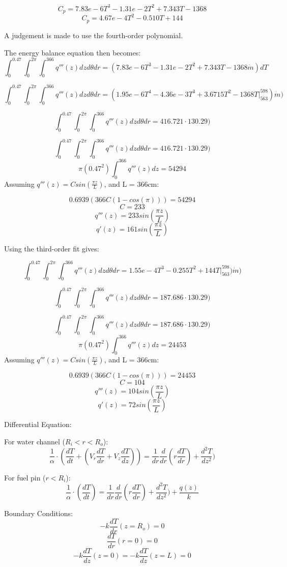 \documentclass[12pt,letterpaper]{article}
\begin{document}
\[C_p = 7.83e-6T^3 -1.31e-2T^2 + 7.343 T - 1368 \]
\[C_p = 4.67e-4T^2 - 0.510 T + 144 \]

A judgement is made to use the fourth-order polynomial.

The energy balance equation then becomes:
\[\int^{0.47}_{0} \int^{2\pi}_{0} \int^{366}_{0} q'''(z) dz d\theta dr= 
    (7.83e-6T^3 -1.31e-2T^2 + 7.343 T - 1368  \dot{m}) dT \]

\[\int^{0.47}_{0} \int^{2\pi}_{0} \int^{366}_{0} q'''(z) dz d\theta dr= 
    (1.95e-6T^4 -4.36e-3T^3 + 3.6715 T^2 - 1368T  \Big|^{598}_{563}) \dot{m})\]

\[\int^{0.47}_{0} \int^{2\pi}_{0} \int^{366}_{0} q'''(z) dz d\theta dr= 
    416.721 \cdot 130.29)\]


\[\int^{0.47}_{0} \int^{2\pi}_{0} \int^{366}_{0} q'''(z) dz d\theta dr= 
    416.721 \cdot 130.29)\]
\[ \pi (0.47^2)  \int^{366}_{0} q'''(z) dz = 54294\]
Assuming $q'''(z) = C sin(\frac{\pi z}{L})$,
and L = 366cm:

\[ 0.6939 (366C(1-cos(\pi))) = 54294\]
\[C = 233\]
\[q'''(z) = 233sin(\frac{\pi z}{L})\]
\[q'(z) = 161sin(\frac{\pi z}{L})\]


Using the third-order fit gives:

\[\int^{0.47}_{0} \int^{2\pi}_{0} \int^{366}_{0} q'''(z) dz d\theta dr= 
     1.55e-4T^3 - 0.255 T^2 + 144T  \Big|^{598}_{563}) \dot{m})\]

\[\int^{0.47}_{0} \int^{2\pi}_{0} \int^{366}_{0} q'''(z) dz d\theta dr= 
    187.686 \cdot 130.29)\]

\[\int^{0.47}_{0} \int^{2\pi}_{0} \int^{366}_{0} q'''(z) dz d\theta dr= 
    187.686 \cdot 130.29)\]
\[ \pi (0.47^2)  \int^{366}_{0} q'''(z) dz = 24453\]
Assuming $q'''(z) = C sin(\frac{\pi z}{L})$,
and L = 366cm:

\[ 0.6939 (366C(1-cos(\pi))) = 24453\]
\[C = 104\]
\[q'''(z) = 104sin(\frac{\pi z}{L})\]
\[q'(z) = 72sin(\frac{\pi z}{L})\]

\pagebreak
Differential Equation:

For water channel ($R_i < r < R_o$):
\[\frac{1}{\alpha} \cdot (\frac{dT}{dt} + (V_r \frac{dT}{dr} + V_z \frac{dT}{dz})) =
  \frac{1}{dr} \frac{d}{dr} (r \frac{dT}{dr}) + \frac{d^2T}{dz^2})\]

For fuel pin ($r < R_i$):
\[\frac{1}{\alpha} \cdot (\frac{dT}{dt}) =
  \frac{1}{dr} \frac{d}{dr} (r \frac{dT}{dr}) + \frac{d^2T}{dz^2}) + \frac{q(z)}{k}\]

Boundary Conditions:
\[-k \frac{dT}{dr}(z=R_o) = 0 \]
\[\frac{dT}{dr}(r=0) = 0\]
\[-k \frac{dT}{dz}(z=0) = -k \frac{dT}{dz}(z=L) = 0 \]
 
\end{document}
